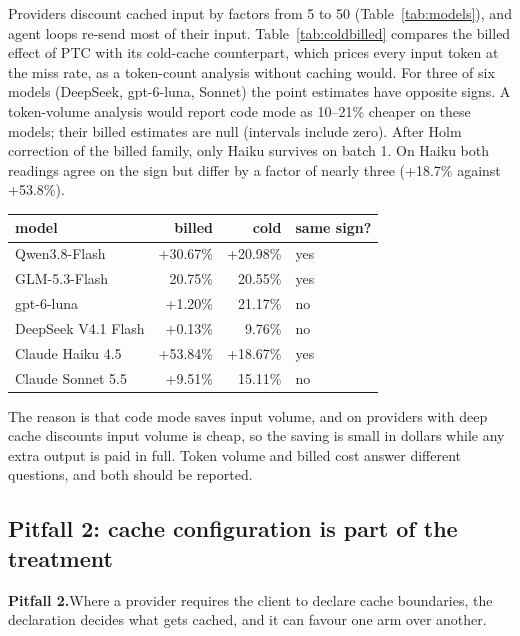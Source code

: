 \documentclass[10pt]{article}
\newcommand*{\mi}{\textminus}   %
\newenvironment{inlinetable}{\par\medskip\noindent\begin{minipage}{\linewidth}\centering\small}{\end{minipage}\par\bigskip}
\newenvironment{pitfall}[1]{\par\medskip\noindent\begin{lrbox}{\pitbox}\begin{minipage}{\dimexpr\linewidth-2\fboxsep-2\fboxrule\relax}\small\textbf{#1}\enskip}{\end{minipage}\end{lrbox}\fbox{\usebox{\pitbox}}\par\medskip}
\begin{document}
Providers discount cached input by factors from 5 to 50 (Table~\ref{tab:models}), and agent loops
re-send most of their input. Table~\ref{tab:coldbilled} compares the billed effect of PTC with its
cold-cache counterpart, which prices every input token at the miss rate, as a token-count analysis
without caching would. For three of six models (DeepSeek, gpt-6-luna, Sonnet) the point estimates have opposite
signs. A token-volume analysis would report code mode as 10--21\% cheaper on these models; their billed
estimates are null (intervals include zero). After Holm correction of the billed family, only Haiku
survives on batch 1. On Haiku both readings agree on the sign but differ by a factor
of nearly three (+18.7\% against +53.8\%).

\begin{inlinetable}
\label{tab:coldbilled}
\begin{tabular}{@{}lrrl@{}}
\toprule
model & billed & cold & same sign? \\
\midrule
Qwen3.8-Flash & +30.67\% & +20.98\% & yes \\
GLM-5.3-Flash & \mi{}20.75\% & \mi{}20.55\% & yes \\
gpt-6-luna & +1.20\% & \mi{}21.17\% & no \\
DeepSeek V4.1 Flash & +0.13\% & \mi{}9.76\% & no \\
Claude Haiku 4.5 & +53.84\% & +18.67\% & yes \\
Claude Sonnet 5.5 & +9.51\% & \mi{}15.11\% & no \\
\bottomrule
\end{tabular}
\end{inlinetable}

The reason is that code mode saves input volume, and on providers with deep cache discounts input
volume is cheap, so the saving is small in dollars while any extra output is paid in full. Token
volume and billed cost answer different questions, and both should be reported.

\subsection{Pitfall 2: cache configuration is part of the treatment}\label{sec:p2}

\begin{pitfall}{Pitfall 2.}Where a provider requires the client to declare cache boundaries, the
declaration decides what gets cached, and it can favour one arm over another.\end{pitfall}
\end{document}
